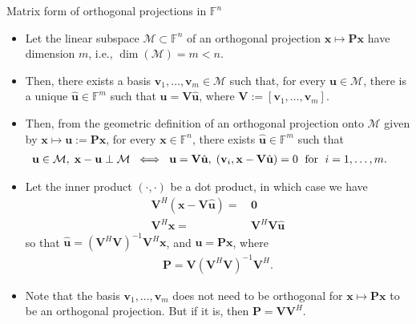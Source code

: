 \documentclass[t,usepdftitle=false]{beamer}
\begin{document}
\begin{frame}{Matrix form of orthogonal projections in $\mathbb{F}^n$}
\begin{itemize}
\item Let the linear subspace $\mathcal{M}\subset\mathbb{F}^n$ of an orthogonal projection $\mathbf{x}\mapsto\mathbf{P}\mathbf{x}$ have dimension $m$, i.e., $\dim(\mathcal{M})=m<n$.
\item Then, there exists a basis $\mathbf{v}_1,\dots,\mathbf{v}_m\in\mathcal{M}$ such that, for every $\mathbf{u}\in\mathcal{M}$, there is a unique $\hat{\mathbf{u}}\in\mathbb{F}^m$ such that $\mathbf{u}=\mathbf{V}\hat{\mathbf{u}}$, where $\mathbf{V}:=[\mathbf{v}_1,\dots,\mathbf{v}_m]$.
\item Then, from the geometric definition of an orthogonal projection onto $\mathcal{M}$ given by $\mathbf{x}\mapsto\mathbf{u}:=\mathbf{P}\mathbf{x}$, for every $\mathbf{x}\in\mathbb{F}^n$, there exists $\hat{\mathbf{u}}\in\mathbb{F}^m$ such that\vspace{-.1cm}
\begin{align*}
\hspace{-.5cm}
\mathbf{u}\in\mathcal{M},\;\mathbf{x}-\mathbf{u}\perp\mathcal{M}
\;\iff\;
\mathbf{u}=\mathbf{V}\hat{\mathbf{u}},\;
(\mathbf{v}_i,\mathbf{x}-\mathbf{V}\hat{\mathbf{u}})=0\;\text{ for }\;i=1,\dots,m.
\end{align*}
\item Let the inner product $(\cdot,\cdot)$ be a dot product, in which case we have\vspace{-.1cm}
\begin{align*}
\mathbf{V}^H(\mathbf{x}-\mathbf{V}\hat{\mathbf{u}})=&\,\mathbf{0}\\
\mathbf{V}^H\mathbf{x}=&\,\mathbf{V}^H\mathbf{V}\hat{\mathbf{u}}
\end{align*}
so that $\hat{\mathbf{u}}=(\mathbf{V}^H\mathbf{V})^{-1}\mathbf{V}^H\mathbf{x}$, and $\mathbf{u}=\mathbf{P}\mathbf{x}$, where
\begin{align*}
\boxed{\mathbf{P}=\mathbf{V}(\mathbf{V}^H\mathbf{V})^{-1}\mathbf{V}^H}.
\end{align*}
\item Note that the basis $\mathbf{v}_1,\dots,\mathbf{v}_m$ does not need to be orthogonal for $\mathbf{x}\mapsto\mathbf{P}\mathbf{x}$ to be an orthogonal projection. 
But if it is, then $\mathbf{P}=\mathbf{V}\mathbf{V}^H$.
\end{itemize}
\end{frame}
\end{document}
